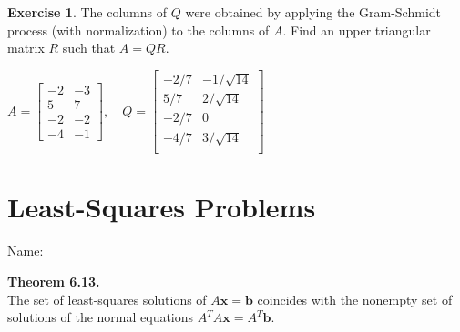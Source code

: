\documentclass[10pt]{book}
\newcommand{\boxcolor}{gray!30}
\newenvironment{boxthm}{\begin{mdframed}[backgroundcolor=\boxcolor,nobreak=true]}{\end{mdframed}}
\newenvironment{boxdef}{\begin{mdframed}[backgroundcolor=\boxcolor,linewidth=0pt,nobreak=true]}{\end{mdframed}}
\theoremstyle{definition}
\newtheorem{exercise}{Exercise}[section]
\newcommand{\name}[1][2.5in]{\vspace{-2.3em}\hfill Name: \underline{\hspace{#1}}}
\newcommand{\R}{\mathbb{R}}
\newcommand{\vect}[1]{\ensuremath{\boldsymbol{\mathbf{#1}}}}
\newcommand{\Axb}{A\vect{x}=\vect{b}}
\newcommand{\xhat}{\hat{\vect{x}}}
\newcommand{\NormEq}{A^TA\vect{x} = A^T\vect{b}}
\begin{document}
\begin{exercise} %
	The columns of $Q$ were obtained by applying the Gram-Schmidt process (with normalization) to the columns of $A$. Find an upper triangular matrix $R$ such that $A=QR$.
	
	\vspace{1em}
	$ A= \begin{bmatrix}-2&-3\\5&7\\-2&-2\\-4&-1\end{bmatrix}, \quad
	Q= \begin{bmatrix}-2/7&-1/\sqrt{14}\\5/7&2/\sqrt{14}\\-2/7&0\\-4/7&3/\sqrt{14}\\\end{bmatrix}$
\end{exercise}
\vfill


\newpage


\section{Least-Squares Problems}
\name


\begin{boxthm}
	\textbf{Theorem 6.13.} \\
	The set of least-squares solutions of $\Axb$ coincides with the nonempty set of solutions of the normal equations $\NormEq$.
\end{boxthm}
\end{document}
